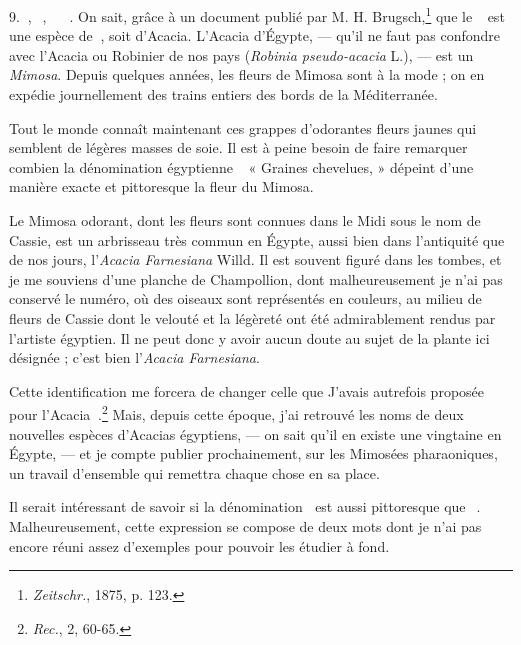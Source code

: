 \documentclass[a4paper, 11pt, oneside, landscape]{article}
\newcommand*\hieroAAAR{}
\newcommand*\hieroAABV{}
\newcommand*\hieroAAHH{}
\newcommand*\hieroAAKY{}
\newcommand*\hieroAALE{}
\newcommand*\hieroAAWP{}
\newcommand*\hieroAAWZ{}
\newcommand*\hieroAAXB{}
\newcommand*\hieroAAXC{}
\newcommand*\hieroAAXD{}
\newcommand*\hieroAAXE{}
\newcommand*\hieroAAXF{}
\newcommand*\hieroAAXG{}
\begin{document}
9. $\hieroAAKY\:\hieroAAXB$, $\hieroAALE\:\hieroAAXC\:\hieroAAXD$, $\hieroAAKY\:\hieroAAXE\:\hieroAAXB\:\hieroAAHH\:\hieroAAWP\:\hieroAAAR\:\hieroAAXF$. On sait, grâce à un document publié par M. H. Brugsch,\footnote{\emph{Zeitschr.}, 1875, p. 123.} que le $\hieroAAWP\:\hieroAAAR\:\hieroAAXF$ est une espèce de $\hieroAAWZ\:\hieroAABV$, soit d'Acacia. L'Acacia d'Égypte, --- qu'il ne faut pas confondre avec l'Acacia ou Robinier de nos pays (\emph{Robinia pseudo-acacia} L.), --- est un \emph{Mimosa}. Depuis quelques années, les fleurs de Mimosa sont à la mode ; on en expédie journellement des trains entiers des bords de la Méditerranée.

Tout le monde connaît maintenant ces grappes d'odorantes fleurs jaunes qui semblent de légères masses de soie. Il est à peine besoin de faire remarquer combien la dénomination égyptienne $\hieroAAWP\:\hieroAAAR\:\hieroAAXF$ « Graines chevelues, » dépeint d'une manière exacte et pittoresque la fleur du Mimosa.

Le Mimosa odorant, dont les fleurs sont connues dans le Midi sous le nom de Cassie, est un arbrisseau très commun en Égypte, aussi bien dans l'antiquité que de nos jours, l'\emph{Acacia Farnesiana} Willd. Il est souvent figuré dans les tombes, et je me souviens d'une planche de Champollion, dont malheureusement je n'ai pas conservé le numéro, où des oiseaux sont représentés en couleurs, au milieu de fleurs de Cassie dont le velouté et la légèreté ont été admirablement rendus par l'artiste égyptien. Il ne peut donc y avoir aucun doute au sujet de la plante ici désignée ; c'est bien l'\emph{Acacia Farnesiana}.

Cette identification me forcera de changer celle que J'avais autrefois proposée pour l'Acacia $\hieroAAXG\:\hieroAABV$.\footnote{\emph{Rec.}, 2, 60-65.} Mais, depuis cette époque, j'ai retrouvé les noms de deux nouvelles espèces d'Acacias égyptiens, --- on sait qu'il en existe une vingtaine en Égypte, --- et je compte publier prochainement, sur les Mimosées pharaoniques, un travail d'ensemble qui remettra chaque chose en sa place.

Il serait intéressant de savoir si la dénomination $\hieroAAKY\:\hieroAAXB$ est aussi pittoresque que $\hieroAAWP\:\hieroAAAR\:\hieroAAXF$. Malheureusement, cette expression se compose de deux mots dont je n'ai pas encore réuni assez d'exemples pour pouvoir les étudier à fond.
\end{document}
